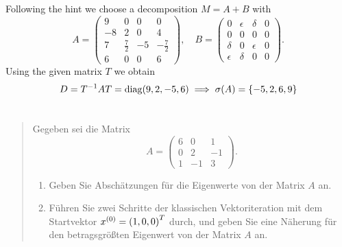 \documentclass{exercise}
\begin{document}
	Following the hint we choose a decomposition \(M = A + B\) with
	\[
		A = \begin{pmatrix}
			9 & 0 & 0 & 0\\
			-8 & 2 & 0 & 4\\
			7 & \frac{7}{2} & -5 & -\frac{7}{2}\\
			6 & 0 & 0 & 6
		\end{pmatrix}, \quad B = \begin{pmatrix}
			0 & \epsilon & \delta & 0\\
			0 & 0 & 0 & 0\\
			\delta & 0 & \epsilon & 0\\
			\epsilon & \delta & 0 & 0
		\end{pmatrix}.
	\]
	Using the given matrix \(T\) we obtain
	\[
		D = T^{-1}AT = \diag\parentheses*{9, 2, -5, 6} \implies \sigma\parentheses*{A} = \braces*{-5, 2, 6, 9}
	\]


	\section{}

	\begin{quote}
		Gegeben sei die Matrix
		\[
			A = \begin{pmatrix}
				6 & 0 & 1\\
				0 & 2 & -1\\
				1 & -1 & 3
			\end{pmatrix}.
		\]
		\begin{enumerate}
			\item Geben Sie Abschätzungen für die Eigenwerte von der Matrix \(A\) an.
			\item Führen Sie zwei Schritte der klassischen Vektoriteration mit dem Startvektor \(x^{\parentheses*{0}} = \parentheses*{1, 0, 0}^T\) durch, und geben Sie eine Näherung für den betragsgrößten Eigenwert von der Matrix \(A\) an.
		\end{enumerate}
	\end{quote}
\end{document}
